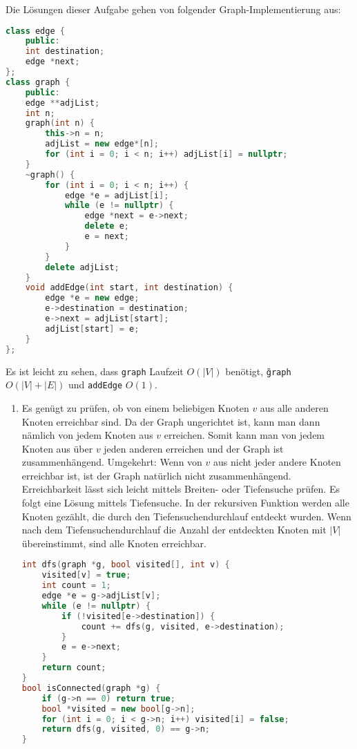 \documentclass[11pt,a4paper]{article}
\begin{document}
\begin{loesung}
    Die Lösungen dieser Aufgabe gehen von folgender Graph-Implementierung aus:
    \begin{lstlisting}[language=c++]
class edge {
    public:
    int destination; 
    edge *next;
};
class graph {
    public: 
    edge **adjList;
    int n;
    graph(int n) {
        this->n = n;
        adjList = new edge*[n];
        for (int i = 0; i < n; i++) adjList[i] = nullptr;
    }
    ~graph() {
        for (int i = 0; i < n; i++) {
            edge *e = adjList[i];
            while (e != nullptr) {
                edge *next = e->next;
                delete e;
                e = next;
            }
        }
        delete adjList;
    }
    void addEdge(int start, int destination) {
        edge *e = new edge;
        e->destination = destination;
        e->next = adjList[start];
        adjList[start] = e;
    }
};
    \end{lstlisting}
    Es ist leicht zu sehen, dass \texttt{graph} Laufzeit $O(|V|)$ benötigt, \texttt{\~graph} $O(|V| + |E|)$ und \texttt{addEdge} $O(1)$.

    \begin{enumerate}
        \item Es genügt zu prüfen, ob von einem beliebigen Knoten $v$ aus alle anderen Knoten erreichbar sind.
        Da der Graph ungerichtet ist, kann man dann nämlich von jedem Knoten aus $v$ erreichen.
        Somit kann man von jedem Knoten aus über $v$ jeden anderen erreichen und der Graph ist zusammenhängend.
        Umgekehrt: Wenn von $v$ aus nicht jeder andere Knoten erreichbar ist, ist der Graph natürlich nicht zusammenhängend.
        Erreichbarkeit lässt sich leicht mittels Breiten- oder Tiefensuche prüfen.
        Es folgt eine Lösung mittels Tiefensuche.
        In der rekursiven Funktion werden alle Knoten gezählt, die durch den Tiefensuchendurchlauf entdeckt wurden.
        Wenn nach dem Tiefensuchendurchlauf die Anzahl der entdeckten Knoten mit $|V|$ übereinstimmt, sind alle Knoten erreichbar.
        \begin{lstlisting}[language=c++]
int dfs(graph *g, bool visited[], int v) {
    visited[v] = true;
    int count = 1;
    edge *e = g->adjList[v];
    while (e != nullptr) {
        if (!visited[e->destination]) {
            count += dfs(g, visited, e->destination);
        }
        e = e->next;
    }
    return count;
}
bool isConnected(graph *g) {
    if (g->n == 0) return true;
    bool *visited = new bool[g->n];
    for (int i = 0; i < g->n; i++) visited[i] = false;
    return dfs(g, visited, 0) == g->n;
}
        \end{lstlisting}


\end{enumerate}
\end{loesung}
\end{document}
